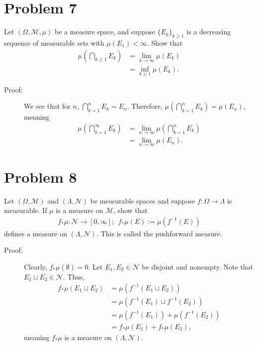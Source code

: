 \documentclass[10pt]{extarticle}
\begin{document}
  \section{Problem 7}%
  Let $(\Omega,\mathcal{M},\mu)$ be a measure space, and suppose $\{E_k\}_{k\geq 1}$ is a decreasing sequence of measurable sets with $\mu(E_1) < \infty$. Show that
  \begin{align*}
    \mu\left(\bigcap_{k\geq 1}E_k\right) &= \lim_{k\rightarrow\infty}\mu(E_k)\\
                                         &= \inf_{k\geq 1}\mu(E_k).
  \end{align*}
  \begin{description}
    \item[Proof:] We see that for $n$, $\bigcap_{k=1}^{n}E_k = E_n$. Therefore, $\mu\left(\bigcap_{k=1}^{n}E_k\right) = \mu(E_n)$, meaning
      \begin{align*}
        \mu\left(\bigcap_{k=1}^{\infty}E_k\right) &= \lim_{n\rightarrow\infty}\mu\left(\bigcap_{k=1}^{n}E_k\right)\\
                                                  &= \lim_{n\rightarrow\infty}\mu(E_n).
      \end{align*}
  \end{description}
  \section{Problem 8}%
  Let $(\Omega,\mathcal{M})$ and $(\Lambda,\mathcal{N})$ be measurable spaces and suppose $f: \Omega \rightarrow \Lambda$ is measurable. If $\mu$ is a measure on $\mathcal{M}$, show that
  \begin{align*}
    f_{\ast}\mu: \mathcal{N}\rightarrow [0,\infty];~~f_{\ast}\mu(E) := \mu(f^{-1}(E))
  \end{align*}
  defines a measure on $(\Lambda,\mathcal{N})$. This is called the pushforward measure.
  \begin{description}
    \item[Proof:] Clearly, $f_{\ast}\mu(\emptyset) = 0$. Let $E_1,E_2\in \mathcal{N}$ be disjoint and nonempty. Note that $E_1 \sqcup E_2\in \mathcal{N}$. Thus,
      \begin{align*}
        f_{\ast}\mu(E_1\sqcup E_2) &= \mu\left(f^{-1}(E_1\sqcup E_2)\right)\\
                                   &= \mu\left(f^{-1}(E_1)\sqcup f^{-1}(E_2)\right)\\
                                   &= \mu(f^{-1}(E_1)) + \mu(f^{-1}(E_2))\\
                                   &= f_{\ast}\mu(E_1) + f_{\ast}\mu(E_2),
      \end{align*}
      meaning $f_{\ast}\mu$ is a measure on $(\Lambda,\mathcal{N})$.
  \end{description}
\end{document}
